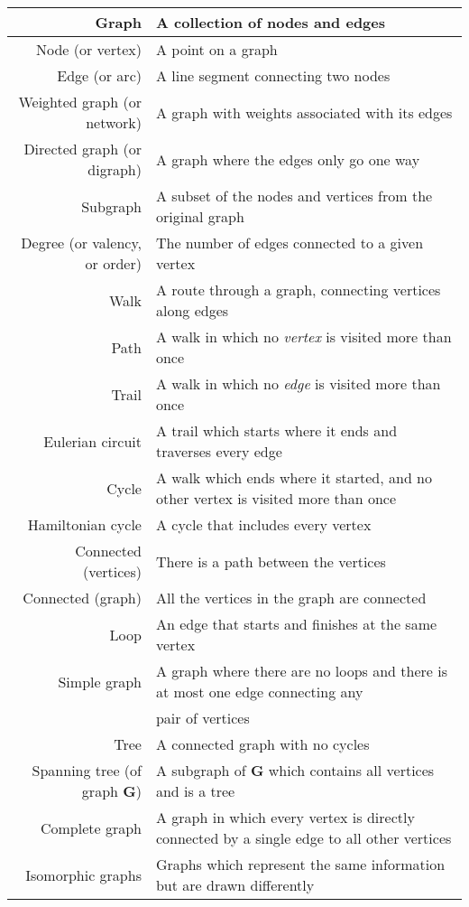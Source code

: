\documentclass[../main.tex]{subfile}
\begin{document}


{\renewcommand{\arraystretch}{1.2}
\begin{tabular}{|r|l|}
	\hline
	Graph & A collection of nodes and edges\\
	\hline
	Node (or vertex) & A point on a graph\\
	\hline
	Edge (or arc) & A line segment connecting two nodes\\
	\hline
	Weighted graph (or network) & A graph with weights associated with its edges\\
	\hline
	Directed graph (or digraph) & A graph where the edges only go one way\\
	\hline
	Subgraph & A subset of the nodes and vertices from the original graph\\
	\hline
	Degree (or valency, or order) & The number of edges connected to a given vertex\\
	\hline
	Walk & A route through a graph, connecting vertices along edges\\
	\hline
	Path & A walk in which no \textit{vertex} is visited more than once\\
	\hline
	Trail & A walk in which no \textit{edge} is visited more than once\\
	\hline
	Eulerian circuit & A trail which starts where it ends and traverses every edge\\
	\hline
	Cycle & A walk which ends where it started, and no other vertex is visited more than once\\
	\hline
	Hamiltonian cycle & A cycle that includes every vertex\\
	\hline
	Connected (vertices) & There is a path between the vertices\\
	\hline
	Connected (graph) & All the vertices in the graph are connected\\
	\hline
	Loop & An edge that starts and finishes at the same vertex\\
	\hline
	Simple graph & A graph where there are no loops and there is at most one edge connecting any\\[-0.3em]&pair of vertices\\
	\hline
	Tree & A connected graph with no cycles\\
	\hline
	Spanning tree (of graph $\mathbf{G}$) & A subgraph of $\mathbf{G}$ which contains all vertices and is a tree\\
	\hline
	Complete graph & A graph in which every vertex is directly connected by a single edge to all other vertices\\
	\hline
	Isomorphic graphs & Graphs which represent the same information but are drawn differently\\
	\hline
\end{tabular}}
\end{document}
